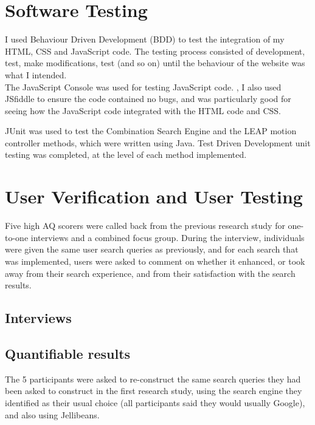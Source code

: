 \documentclass[a4paper, 11pt]{article}
\begin{document}
\section{Software Testing}


I used Behaviour Driven Development (BDD) to test the integration of my HTML, CSS and JavaScript code. The testing process consisted of development, test, make modifications, test (and so on) until the behaviour of the website was what I intended.\\

\vspace{5mm}
The JavaScript Console was used for testing JavaScript code. \cite{javascripttesting}, I also used JSfiddle \cite{jsfiddle} to ensure the code contained no bugs, and was particularly good for seeing how the JavaScript code integrated with the HTML code and CSS.

\vspace{5mm}
JUnit was used to test the Combination Search Engine and the LEAP motion controller methods, which were written using Java. Test Driven Development unit testing was completed, at the level of each method implemented.

\section{User Verification and User Testing}
Five high AQ scorers were called back from the previous research study for one-to-one interviews and a combined focus group. During the interview, individuals were given the same user search queries as previously, and for each search that was implemented, users were asked to comment on whether it enhanced, or took away from their search experience, and from their satisfaction with the search results. 

\subsection{Interviews}
\subsection{Quantifiable results}
The 5 participants were asked to re-construct the same search queries they had been asked to construct in the first research study, using the search engine they identified as their usual choice (all participants said they would usually Google), and also using Jellibeans. 
\end{document}
